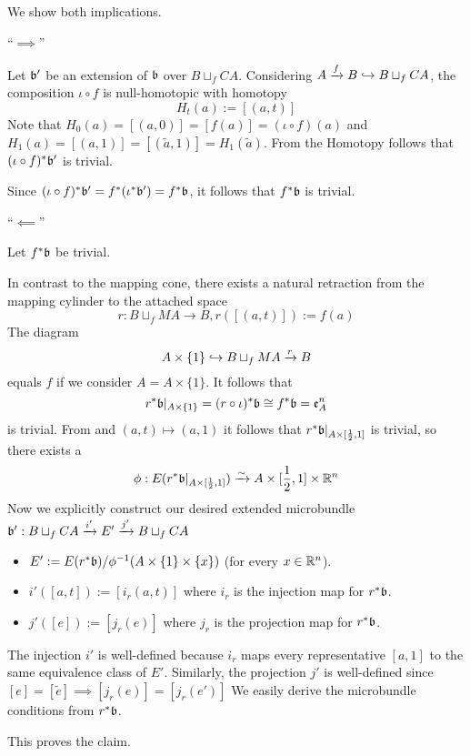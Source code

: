 \begin{myproof}
We show both implications.

``$\implies$''

Let $\bb'$ be an extension of $\bb$ over $B \sqcup_f CA$.
Considering $A \xto{f} B \incl B \sqcup_f CA$, the composition $\iota \circ f$ is null-homotopic with homotopy
\[ H_t(a) := [(a, t)] \]
Note that $H_0(a) = [(a, 0)] = [f(a)] = (\iota \circ f)(a)$ and $H_1(a) = [(a, 1)] = [(\tilde{a}, 1)] = H_1(\tilde{a})$.
From the Homotopy  follows that $(\iota \circ f)^*\bb'$ is trivial. 

Since $(\iota \circ f)^*\bb' = f^*(\iota^*\bb') = f^*\bb$, it follows that $f^*\bb$ is trivial.

``$\impliedby$''

Let $f^*\bb$ be trivial.

In contrast to the mapping cone, there exists a natural retraction from the mapping cylinder to the attached space
\[ r: B \sqcup_f MA \to B, r([(a, t)]) := f(a) \]
The diagram
\[ A \times \{1\} \incl B \sqcup_f MA \xto{r} B \]
equals $f$ if we consider $A = A \times \{1\}$.
It follows that
\[ r^*\bb\restr{A \times \{1\}} = (r \circ \iota)^*\bb \cong f^*\bb = \mathfrak{e}^n_A\]
is trivial.
From  and $(a, t) \mapsto (a, 1)$ it follows that $r^*\bb\restr{A \times [\frac{1}{2}, 1]}$ is trivial,
so there exists a
\[ \phi: E(r^*\bb\restr{A \times [\frac{1}{2}, 1]}) \isomto A \times [\frac{1}{2}, 1] \times \R^n \]
Now we explicitly construct our desired extended microbundle $\bundledef{\bb'}{B \sqcup_f CA}{E'}{i'}{j'}$
\begin{itemize}
    \item $E' := E(r^*\bb) / \phi^{-1}(A \times \{1\} \times \{x\})$ (for every $x \in \R^n$).
    \item $i'([a, t]) := [i_r(a, t)]$ where $i_r$ is the injection map for $r^*\bb$.
    \item $j'([e]) := [j_r(e)]$ where $j_r$ is the projection map for $r^*\bb$.
\end{itemize}
The injection $i'$ is well-defined because $i_r$ maps every representative $[a, 1]$ to the same equivalence class of $E'$.
Similarly, the projection $j'$ is well-defined since $[e] = [\tilde{e}] \implies [j_r(e)] = [j_r(e')]$
We easily derive the microbundle conditions from $r^*\bb$.

This proves the claim.
\end{myproof}